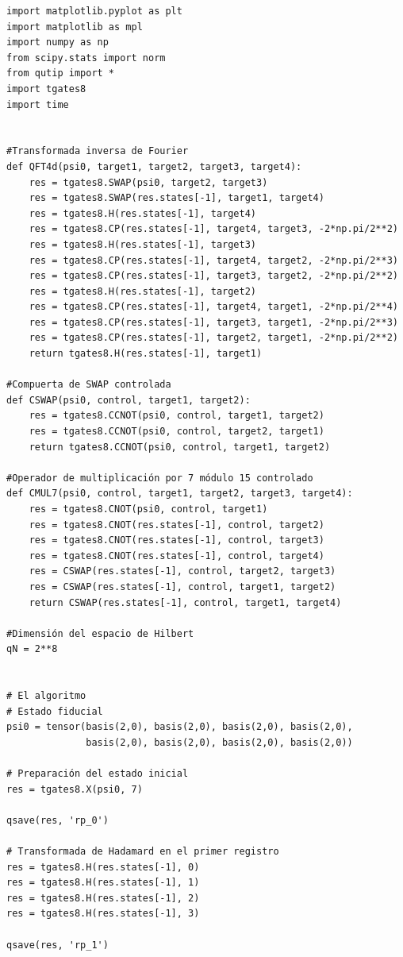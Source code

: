 \begin{verbatim}
import matplotlib.pyplot as plt
import matplotlib as mpl
import numpy as np
from scipy.stats import norm
from qutip import *
import tgates8
import time


#Transformada inversa de Fourier
def QFT4d(psi0, target1, target2, target3, target4):
    res = tgates8.SWAP(psi0, target2, target3)
    res = tgates8.SWAP(res.states[-1], target1, target4)
    res = tgates8.H(res.states[-1], target4)
    res = tgates8.CP(res.states[-1], target4, target3, -2*np.pi/2**2)
    res = tgates8.H(res.states[-1], target3)
    res = tgates8.CP(res.states[-1], target4, target2, -2*np.pi/2**3)
    res = tgates8.CP(res.states[-1], target3, target2, -2*np.pi/2**2)
    res = tgates8.H(res.states[-1], target2)
    res = tgates8.CP(res.states[-1], target4, target1, -2*np.pi/2**4)
    res = tgates8.CP(res.states[-1], target3, target1, -2*np.pi/2**3)
    res = tgates8.CP(res.states[-1], target2, target1, -2*np.pi/2**2)
    return tgates8.H(res.states[-1], target1)

#Compuerta de SWAP controlada
def CSWAP(psi0, control, target1, target2):
    res = tgates8.CCNOT(psi0, control, target1, target2)
    res = tgates8.CCNOT(psi0, control, target2, target1)
    return tgates8.CCNOT(psi0, control, target1, target2)

#Operador de multiplicación por 7 módulo 15 controlado
def CMUL7(psi0, control, target1, target2, target3, target4):
    res = tgates8.CNOT(psi0, control, target1)
    res = tgates8.CNOT(res.states[-1], control, target2)
    res = tgates8.CNOT(res.states[-1], control, target3)
    res = tgates8.CNOT(res.states[-1], control, target4)
    res = CSWAP(res.states[-1], control, target2, target3)
    res = CSWAP(res.states[-1], control, target1, target2)
    return CSWAP(res.states[-1], control, target1, target4)

#Dimensión del espacio de Hilbert
qN = 2**8


# El algoritmo
# Estado fiducial
psi0 = tensor(basis(2,0), basis(2,0), basis(2,0), basis(2,0),
              basis(2,0), basis(2,0), basis(2,0), basis(2,0))

# Preparación del estado inicial
res = tgates8.X(psi0, 7)

qsave(res, 'rp_0')

# Transformada de Hadamard en el primer registro
res = tgates8.H(res.states[-1], 0)
res = tgates8.H(res.states[-1], 1)
res = tgates8.H(res.states[-1], 2)
res = tgates8.H(res.states[-1], 3)

qsave(res, 'rp_1')


\end{verbatim}
